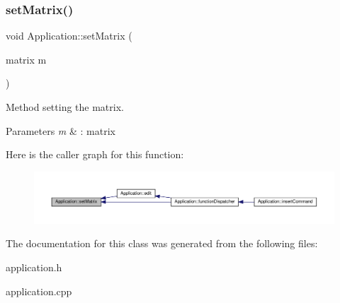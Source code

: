\subsubsection{\texorpdfstring{set\+Matrix()}{setMatrix()}}
{\footnotesize\ttfamily void Application\+::set\+Matrix (\begin{DoxyParamCaption}\item[{matrix}]{m }\end{DoxyParamCaption})}

Method setting the matrix. 
\begin{DoxyParams}{Parameters}
{\em m} & \+: matrix \\
\hline
\end{DoxyParams}
Here is the caller graph for this function\+:
\nopagebreak
\begin{figure}[H]
\begin{center}
\leavevmode
\includegraphics[width=350pt]{class_application_a56b4a55e9eabd40b7f0033ba39631ebe_icgraph}
\end{center}
\end{figure}


The documentation for this class was generated from the following files\+:\begin{DoxyCompactItemize}
\item 
application.\+h\item 
application.\+cpp\end{DoxyCompactItemize}
